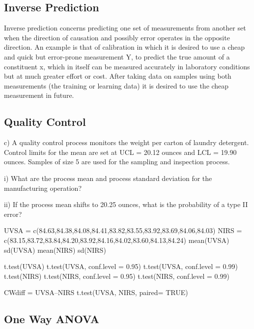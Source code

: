 

\subsection{Inverse Prediction}
Inverse prediction concerns predicting one set of measurements from another set when the direction of causation and possibly error operates in the opposite direction. An example is that of calibration in which it is desired to use a cheap and quick but error-prone measurement Y, to predict the true amount of a constituent x, which in itself can be measured accurately in laboratory conditions but at much greater effort or cost. After taking data on samples using both measurements (the training or learning data) it is desired to use the cheap measurement in future.


\subsection{Quality Control}
c) A quality control process monitors the weight per carton of laundry detergent. 
Control limits for the mean are set at UCL = 20.12 ounces and LCL = 19.90 ounces. 
Samples of size 5 are used for the sampling and inspection process.

i) What are the process mean and process standard deviation for the manufacturing operation?

ii) If the process mean shifts to 20.25 ounces, what is the probability of a type II error? 	
   


UVSA = c(84.63,84.38,84.08,84.41,83.82,83.55,83.92,83.69,84.06,84.03) 
NIRS = c(83.15,83.72,83.84,84.20,83.92,84.16,84.02,83.60,84.13,84.24)
mean(UVSA)
sd(UVSA)
mean(NIRS)
sd(NIRS)


t.test(UVSA)
t.test(UVSA, conf.level = 0.95)
t.test(UVSA, conf.level = 0.99)
t.test(NIRS)
t.test(NIRS, conf.level = 0.95)
t.test(NIRS, conf.level = 0.99)

CWdiff = UVSA–NIRS
t.test(UVSA, NIRS, paired= TRUE)


\subsection{One Way ANOVA}

